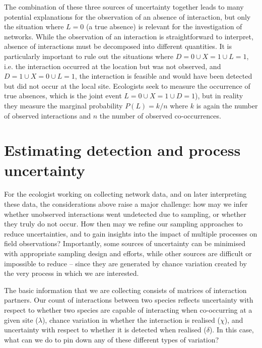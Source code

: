 \documentclass[12pt]{article}
\begin{document}
    The combination of these three sources of uncertainty together leads to many potential explanations for the observation of an absence of interaction, but only the situation where $L = 0$ (a true absence) is relevant for the investigation of networks. While the observation of an interaction is straightforward to interpret, absence of interactions must be decomposed into different quantities. It is particularly important to rule out the situations where $D=0 \cup X = 1 \cup L=1$, i.e. the interaction occurred at the location but was not observed, and $D=1 \cup X = 0 \cup L =1$, the interaction is feasible and would have been detected but did not occur at the local site. Ecologists seek to measure the occurrence of true absences, which is the joint event $L=0 \cup X=1 \cup D=1$), but in reality they measure the marginal probability $P(L) = k/n$ where $k$ is again the number of observed interactions and $n$ the number of observed co-occurrences. %

\section*{Estimating detection and process uncertainty}

  For the ecologist working on collecting network data, and on later interpreting these data, the considerations above raise a major challenge: how may we infer whether unobserved interactions went undetected due to sampling, or whether they truly do not occur. How then may we refine our sampling approaches to reduce uncertainties, and to gain insights into the impact of multiple processes on field observations? Importantly, some sources of uncertainty can be minimised with appropriate sampling design and efforts, while other sources are difficult or impossible to reduce – since they are generated by chance variation created by the very process in which we are interested.


  The basic information that we are collecting consists of matrices of interaction partners. Our count of interactions between two species reflects uncertainty with respect to whether two species are capable of interacting when co-occurring at a given site ($\lambda$), chance variation in whether the interaction is realised ($\chi$),  and uncertainty with respect to whether it is detected when realised ($\delta$). In this case, what can we do to pin down any of these different types of variation?
\end{document}
